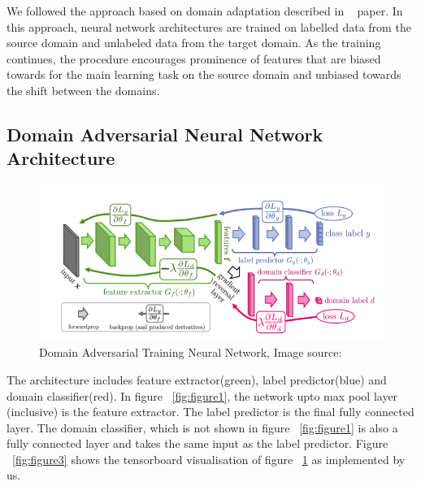 \documentclass[11pt,a4paper]{article}
\begin{document}
We followed the approach based on domain adaptation described in ~\cite{Ganin:2016} paper.
In this approach, neural network architectures are trained on labelled data from
the source domain and unlabeled data from the target domain. As the training continues,
the procedure encourages prominence of features that are biased towards for the main
learning task on the source domain and unbiased towards the shift between the domains.

\subsection{Domain Adversarial Neural Network Architecture}
\begin{figure}[htb]
\begin{center}
\includegraphics[width=\columnwidth]{dann.png}
\end{center}
\caption{Domain Adversarial Training Neural Network, Image source: ~\cite{Ganin:2016}}
\label{fig:figure2}
\end{figure}

The architecture includes feature extractor(green), label predictor(blue) and domain classifier(red). In figure ~\ref{fig:figure1}, the network upto max pool layer (inclusive) is the feature extractor. The label predictor is the final fully connected layer. The domain classifier, which is not shown in figure ~\ref{fig:figure1} is also a fully connected layer and takes the same input as the label predictor. Figure ~\ref{fig:figure3} shows the tensorboard visualisation of figure ~\ref{fig:figure2} as implemented by us.
\end{document}

